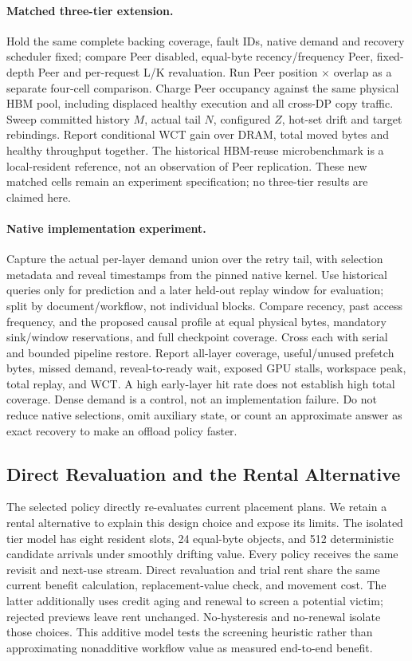 \documentclass[sigplan,10pt,anonymous,nonacm]{acmart}
\begin{document}
\paragraph{Matched three-tier extension.}
Hold the same complete backing coverage, fault IDs, native demand and recovery
scheduler fixed; compare Peer disabled, equal-byte recency/frequency Peer,
fixed-depth Peer and per-request L/K revaluation. Run Peer position
$\times$ overlap as a separate four-cell comparison. Charge Peer occupancy
against the same physical HBM pool, including displaced healthy execution
and all cross-DP copy traffic. Sweep committed history $M$, actual tail
$N$, configured $Z$, hot-set drift and target rebindings. Report conditional
WCT gain over DRAM, total moved bytes and healthy throughput together.
The historical HBM-reuse microbenchmark is a local-resident reference,
not an observation of Peer replication. These new matched cells remain an
experiment specification; no three-tier results are claimed here.

\paragraph{Native implementation experiment.}
Capture the actual per-layer demand union over the retry tail, with
selection metadata and reveal timestamps from the pinned native kernel.
Use historical queries only for prediction and a later held-out replay
window for evaluation; split by document/workflow, not individual blocks.
Compare recency, past access frequency, and the proposed causal profile
at equal physical bytes, mandatory sink/window reservations, and full
checkpoint coverage. Cross each with serial and bounded pipeline restore.
Report all-layer coverage, useful/unused prefetch bytes, missed demand,
reveal-to-ready wait, exposed GPU stalls, workspace peak, total replay,
and WCT. A high early-layer hit rate does not establish high total
coverage. Dense demand is a control, not an implementation failure.
Do not reduce native selections, omit auxiliary state, or count an
approximate answer as exact recovery to make an offload policy faster.

\FloatBarrier
\subsection{Direct Revaluation and the Rental Alternative}
\label{sec:eval-rental}

The selected policy directly re-evaluates current placement plans.
We retain a rental alternative to explain this design choice and expose
its limits. The isolated tier model has eight resident slots, 24 equal-byte objects,
and 512 deterministic candidate arrivals under smoothly drifting value.
Every policy receives the same revisit and next-use stream. Direct
revaluation and trial rent share the same current benefit calculation,
replacement-value check, and movement cost. The latter additionally uses
credit aging and renewal to screen a potential victim; rejected previews
leave rent unchanged. No-hysteresis and no-renewal isolate those choices.
This additive model tests the screening heuristic rather than approximating
nonadditive workflow value as measured end-to-end benefit.
\end{document}
